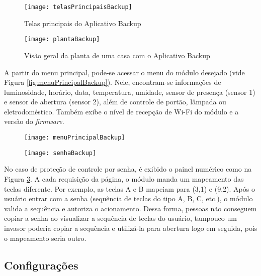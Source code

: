 \begin{figure}[H]
	\centering
	\caption{Telas principais do Aplicativo Backup}
  \texttt{[image: telasPrincipaisBackup]}
\label{fig:telasPrincipaisBackup}
\end{figure}

\begin{figure}[H]
  \centering
  \caption{Visão geral da planta de uma casa com o Aplicativo Backup}
  \texttt{[image: plantaBackup]}
  \label{fig:plantaBackup}
\end{figure}

A partir do menu principal, pode-se acessar o menu do módulo desejado (vide Figura \ref{fig:menuPrincipalBackup}). Nele, encontram-se informações de luminosidade, horário, data, temperatura, umidade, sensor de presença (sensor 1) e sensor de abertura (sensor 2), além de controle de portão, lâmpada ou eletrodoméstico. Também exibe o nível de recepção de Wi-Fi do módulo e a versão do \emph{firmware}.

\begin{figure}[hbp]
    \centering
    \begin{minipage}{.4\linewidth}
        \centering
        \texttt{[image: menuPrincipalBackup]}
        \label{fig:menuPrincipalBackup}
    \end{minipage}
    \hfill
    \begin{minipage}{.4\linewidth}
        \centering
        \texttt{[image: senhaBackup]}
        \label{fig:senhaBackup}
    \end{minipage}
\end{figure}

No caso de proteção de controle por senha, é exibido o painel numérico como na Figura \ref{fig:senhaBackup}. A cada requisição da página, o módulo manda um mapeamento das teclas diferente. Por exemplo, as teclas A e B mapeiam para (3,1) e (9,2). Após o usuário entrar com a senha (sequência de teclas do tipo A, B, C, etc.), o módulo valida a sequência e autoriza o acionamento. Dessa forma, pessoas não conseguem copiar a senha ao visualizar a sequência de teclas do usuário, tampouco um invasor poderia copiar a sequência e utilizá-la para abertura logo em seguida, pois o mapeamento seria outro.

\subsection{Configurações}

